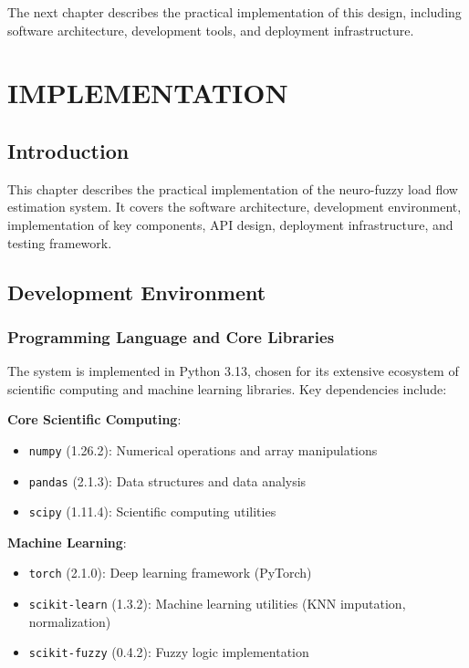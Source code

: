 \documentclass[12pt,a4paper]{report}
\begin{document}
The next chapter describes the practical implementation of this design, including software architecture, development tools, and deployment infrastructure.


\chapter{IMPLEMENTATION}

\section{Introduction}

This chapter describes the practical implementation of the neuro-fuzzy load flow estimation system. It covers the software architecture, development environment, implementation of key components, API design, deployment infrastructure, and testing framework.

\section{Development Environment}

\subsection{Programming Language and Core Libraries}

The system is implemented in Python 3.13, chosen for its extensive ecosystem of scientific computing and machine learning libraries. Key dependencies include:

\textbf{Core Scientific Computing}:
\begin{itemize}
    \item \texttt{numpy} (1.26.2): Numerical operations and array manipulations
    \item \texttt{pandas} (2.1.3): Data structures and data analysis
    \item \texttt{scipy} (1.11.4): Scientific computing utilities
\end{itemize}

\textbf{Machine Learning}:
\begin{itemize}
    \item \texttt{torch} (2.1.0): Deep learning framework (PyTorch)
    \item \texttt{scikit-learn} (1.3.2): Machine learning utilities (KNN imputation, normalization)
    \item \texttt{scikit-fuzzy} (0.4.2): Fuzzy logic implementation
\end{itemize}
\end{document}
